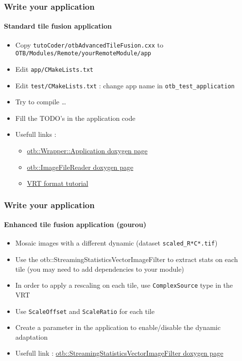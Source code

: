 \documentclass[8pt]{beamer}
\begin{document}
\begin{frame}
\frametitle{Write your  application}
\framesubtitle{Standard tile fusion application}
\begin{itemize}
\item Copy \texttt{tutoCoder/otbAdvancedTileFusion.cxx} to \texttt{OTB/Modules/Remote/yourRemoteModule/app}
\item Edit \texttt{app/CMakeLists.txt}
\item Edit \texttt{test/CMakeLists.txt} : change app name in \texttt{otb\_test\_application}
\item Try to compile \ldots
\item Fill the TODO's in the application code
\item Usefull links :
\begin{itemize}
\item \href{https://www.orfeo-toolbox.org/doxygen/classotb_1_1Wrapper_1_1Application.html}{otb::Wrapper::Application doxygen page}
\item \href{https://www.orfeo-toolbox.org/doxygen/classotb_1_1ImageFileReader.html}{otb::ImageFileReader doxygen page}
\item \href{http://www.gdal.org/gdal_vrttut.html}{VRT format tutorial}
\end{itemize}
\end{itemize}
\end{frame}

\begin{frame}
\frametitle{Write your  application}
\framesubtitle{Enhanced tile fusion application (gourou)}
\begin{itemize}
\item Mosaic images with a different dynamic (dataset \texttt{scaled\_R*C*.tif})
\item Use the otb::StreamingStatisticsVectorImageFilter to extract stats on each tile (you may need to add dependencies to your module)
\item In order to apply a rescaling on each tile, use \texttt{ComplexSource} type in the VRT
\item Use \texttt{ScaleOffset} and \texttt{ScaleRatio} for each tile 
\item Create a parameter in the application to enable/disable the dynamic adaptation
\item Usefull link : \href{https://www.orfeo-toolbox.org/doxygen/classotb_1_1StreamingStatisticsVectorImageFilter.html}{otb::StreamingStatisticsVectorImageFilter doxygen page}
\end{itemize}
\end{frame}
\end{document}
